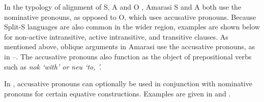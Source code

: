 In the typology of alignment of S,
A and O \citep{Dixon1994}, Amarasi S
and A both use the nominative pronouns,
as opposed to O,
which uses accusative pronouns.
Because Split-S languages are also common in the wider region,
examples are shown below for non-active intransitive,
active intransitive, and transitive clauses.
As mentioned above, oblique arguments in Amarasi use the accusative
pronouns, as in --.
The accusative pronouns also function as the object of prepositional
verbs such as \it{nok} ‘with’ or \it{neu} ‘to,
’.

\begin{exe}
	\label{ex:13-27}
	\label{ex:13-28}
	\label{ex:13-29}
	\label{ex:13-30}
	\label{ex:13-31}
\end{exe}

In ,
accusative pronouns can optionally be used in conjunction with
nominative pronouns for certain equative constructions.
Examples are given in 
and .

\begin{exe}
	\label{ex:13-32}
	\label{ex:13-33}
\end{exe}

